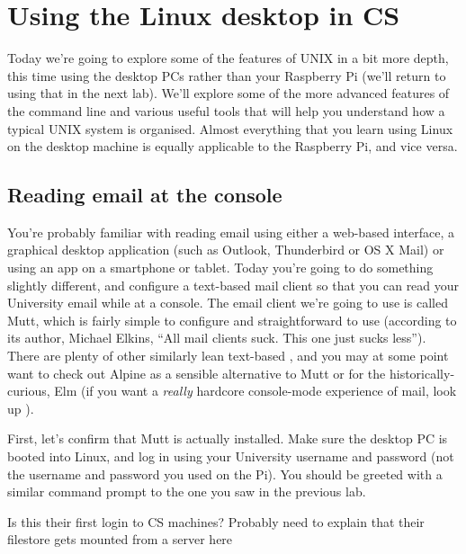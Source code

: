 \chapter{Using the Linux desktop in CS}


Today we're going to explore some of the features of UNIX in a bit more depth, this time using the desktop PCs rather than your Raspberry Pi (we'll return to using that in the next lab). We'll explore some of the more advanced features of the command line and various useful tools that will help you understand how a typical UNIX system is organised. Almost everything that you learn using Linux on the desktop machine is equally applicable to the Raspberry Pi, and vice versa. 

\section{Reading email at the console}

You're probably familiar with reading email using either a web-based interface, a graphical desktop application (such as Outlook, Thunderbird or OS X Mail) or using an app on a smartphone or tablet. Today you're going to do something slightly different, and configure a text-based mail client so that you can read your University email while at a console. The email client we're going to use is called Mutt, which is fairly simple to configure and straightforward to use (according to its author, Michael Elkins, ``All mail clients suck. This one just sucks less''). There are plenty of other similarly lean text-based , and you may at some point want to check out Alpine as a sensible alternative to Mutt or for the historically-curious, Elm (if you want a \textit{really} hardcore console-mode experience of mail, look up ).

First, let's confirm that Mutt is actually installed. Make sure the desktop PC is booted into Linux, and log in using your University username and password (not the username and password you used on the Pi). You should be greeted with a similar command prompt to the one you saw in the previous lab.

\begin{note}
Is this their first login to CS machines? Probably need to explain that their filestore gets mounted from a server here
\end{note}

